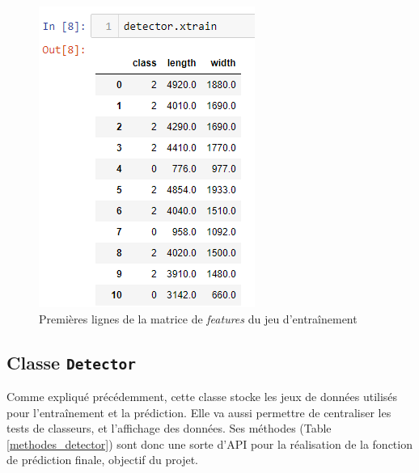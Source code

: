 \documentclass[a4paper]{report}
\begin{document}
\begin{figure}
\centering
\includegraphics[scale=.8]{img/xtrain.png}
\caption{Premières lignes de la matrice de \emph{features} du jeu d'entraînement\label{xtrain}}
\end{figure}

\subsection{Classe \texttt{Detector}}

Comme expliqué précédemment, cette classe stocke les jeux de données utilisés pour l'entraînement et la prédiction. Elle va aussi permettre de centraliser les tests de classeurs, et l'affichage des données. Ses méthodes (Table \ref{methodes_detector}) sont donc une sorte d'API pour la réalisation de la fonction de prédiction finale, objectif du projet.
\end{document}
